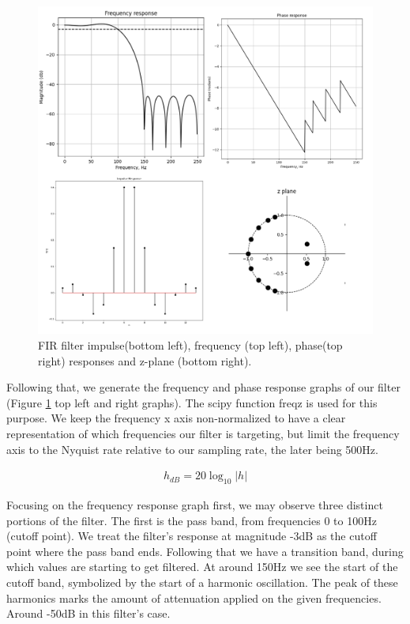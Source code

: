 \documentclass[10pt,a4paper,twocolumn]{article}
\begin{document}
\begin{figure} %
	[!h]
	\centering
	\includegraphics*[width=.8\columnwidth]{fir_characteristics.png} %
	\caption{FIR filter impulse(bottom left), frequency (top left), phase(top right) responses and z-plane (bottom right).}
	\label{f2}
	\vspace{6pt}
\end{figure}

Following that, we generate the frequency and phase response graphs of our filter (Figure \ref{f2} top left and right graphs). The scipy function freqz is used for this purpose. We keep the frequency x axis non-normalized to have a clear representation of which frequencies our filter is targeting, but limit the frequency axis to the Nyquist rate relative to our sampling rate, the later being 500Hz.

\begin{eqnarray}
h_{dB} = 20\log_{10}|h|  
\label{m1}
\end{eqnarray}


Focusing on the frequency response graph first, we may observe three distinct portions of the filter. The first is the pass band, from frequencies 0 to 100Hz (cutoff point). We treat the filter's response at magnitude -3dB as the cutoff point where the pass band ends. Following that we have a transition band, during which values are starting to get filtered. At around 150Hz we see the start of the cutoff band, symbolized by the start of a harmonic oscillation. The peak of these harmonics marks the amount of attenuation applied on the given frequencies. Around -50dB in this filter's case.
\end{document}
